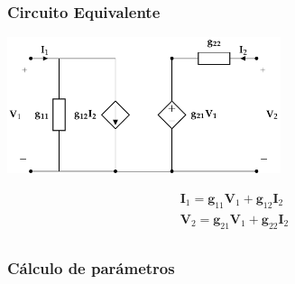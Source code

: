 \subsubsection{Circuito Equivalente}
\label{sec:orga0eb94b}
\begin{center}
\includegraphics[height=4cm]{../figs/circuitoEquivalenteG.pdf}
\end{center}

\[
\begin{array}{l}
  \mathbf{I}_1 = \mathbf{g}_{11} \mathbf{V}_1 + \mathbf{g}_{12} \mathbf{I}_2\\
  \mathbf{V}_2 = \mathbf{g}_{21} \mathbf{V}_1 + \mathbf{g}_{22} \mathbf{I}_2\\
\end{array}
\]

\subsubsection{Cálculo de parámetros}
\label{sec:org2365b60}

